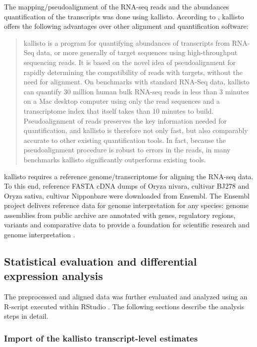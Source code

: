 The mapping/pseudoalignment of the RNA-seq reads and the abundances quantification of the transcripts was done using kallisto. According to \autocite{10.1038/nbt.3519}, kallisto offers the following advantages over other alignment and quantification software:
\begin{quote}
    kallisto is a program for quantifying abundances of transcripts from RNA-Seq data, or more generally of target sequences using high-throughput sequencing reads. It is based on the novel idea of pseudoalignment for rapidly determining the compatibility of reads with targets, without the need for alignment. On benchmarks with standard RNA-Seq data, kallisto can quantify 30 million human bulk RNA-seq reads in less than 3 minutes on a Mac desktop computer using only the read sequences and a transcriptome index that itself takes than 10 minutes to build. Pseudoalignment of reads preserves the key information needed for quantification, and kallisto is therefore not only fast, but also comparably accurate to other existing quantification tools. In fact, because the pseudoalignment procedure is robust to errors in the reads, in many benchmarks kallisto significantly outperforms existing tools.
\end{quote}

kallisto requires a reference genome/transcriptome for aligning the RNA-seq data. To this end, reference FASTA cDNA dumps of Oryza nivara, cultivar BJ278 and Oryza sativa, cultivar Nipponbare were downloaded from Ensembl. The Ensembl project delivers reference data for genome interpretation for any species: genome assemblies from public archive are annotated with genes, regulatory regions, variants and comparative data to provide a foundation for scientific research and genome interpretation \autocite{10.1093/nar/gkab1049}.


\subsection{Statistical evaluation and differential expression analysis}

The preprocessed and aligned data was further evaluated and analyzed using an R-script \autocite{R-base} executed within RStudio \autocite{RStudio}. The following sections describe the analysis steps in detail.

\subsubsection{Import of the kallisto transcript-level estimates}

